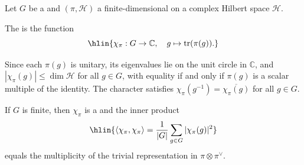 \begin{definition} \label{definition:character_of_a_finite_dimensional_unitary_representation_of_a_group}

    Let $G$ be a  and $(\pi, \mathcal{H})$ a finite-dimensional  on a complex Hilbert space $\mathcal{H}$.

    The  is the function
    $$\hlin{\chi_\pi : G \to \mathbb{C}, \quad g \mapsto \mathrm{tr}(\pi(g)).}$$

    Since each $\pi(g)$ is unitary, its eigenvalues lie on the unit circle in $\mathbb{C}$, and $|\chi_\pi(g)| \leq \dim \mathcal{H}$ for all $g \in G$, with equality if and only if $\pi(g)$ is a scalar multiple of the identity. The character satisfies $\chi_\pi(g^{-1}) = \overline{\chi_\pi(g)}$ for all $g \in G$.

    If $G$ is finite, then $\chi_\pi$ is a  and the inner product
    $$\hlin{\langle \chi_\pi, \chi_\pi \rangle = \frac{1}{|G|} \sum_{g \in G} |\chi_\pi(g)|^2}$$
    equals the multiplicity of the trivial representation in $\pi \otimes \pi^\vee$.
\end{definition}
